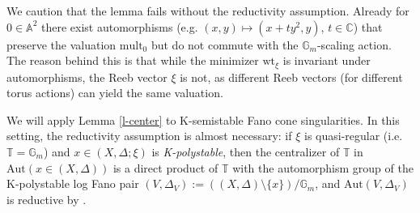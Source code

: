\documentclass[12pt]{amsart}
\theoremstyle{definition}
\newcommand{\bC}{\mathbb{C}}
\newcommand{\bA}{\mathbb{A}}
\newcommand{\bT}{\mathbb{T}}
\newcommand{\bG}{\mathbb{G}}
\newcommand{\mult}{\mathrm{mult}}
\newcommand{\Aut}{\mathrm{Aut}}
\newcommand{\wt}{\mathrm{wt}}
\numberwithin{equation}{section}
\begin{document}
We caution that the lemma fails without the reductivity assumption. Already for $0\in \bA^2$ there exist automorphisms (e.g. $(x,y)\mapsto (x+ty^2,y)$, $t\in \bC$) that preserve the valuation $\mult_0$ but do not commute with the $\bG_m$-scaling action. The reason behind this is that while the minimizer $\wt_\xi$ is invariant under automorphisms, the Reeb vector $\xi$ is not, as different Reeb vectors (for different torus actions) can yield the same valuation. 

We will apply Lemma \ref{l-center} to K-semistable Fano cone singularities. In this setting, the reductivity assumption is almost necessary: if $\xi$ is quasi-regular (i.e. $\bT=\bG_m$) and $x\in (X,\Delta;\xi)$ is \emph{K-polystable}, then the centralizer of $\bT$ in $\Aut(x\in (X,\Delta))$ is a direct product of $\bT$ with the automorphism group of the K-polystable log Fano pair $(V,\Delta_V):=\left((X,\Delta)\setminus\{x\}\right)/\bG_m$, and $\Aut(V,\Delta_V)$ is reductive by \cite{ABHLX-reductivity}. 
\end{document}
